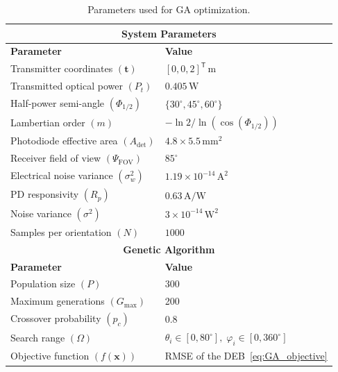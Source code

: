 \documentclass[journal]{IEEEtran}
\begin{document}
\begin{table}[tbh]
\centering
\caption{Parameters used for GA optimization.}
\label{tab:ga_params}
\begin{tabular}{|l|l|}
\hline
\multicolumn{2}{|c|}{\textbf{System Parameters}} \\ \hline
\textbf{Parameter}                  & \textbf{Value}                         \\ \hline
Transmitter coordinates $(\mathbf{t})$ & \([0,0,2]^{\mathsf T}\,\mathrm{m}\)              \\ \hline
Transmitted optical power $(P_t)$   & \(0.405\,\mathrm{W}\)            \\ \hline
Half-power semi-angle $(\Phi_{1/2})$ & \(\{30^\circ,45^\circ,60^\circ\}\)                \\ \hline
Lambertian order $(m)$              & \(-\ln2/\ln(\cos(\Phi_{1/2}))\)    \\ \hline
Photodiode effective area $(A_{\mathrm{det}})$        & \(4.8\times5.5\,\mathrm{mm}^2\) \\ \hline
Receiver field of view $(\Psi_{\mathrm{FOV}})$        & \(85^\circ\)       \\ \hline
Electrical noise variance $(\sigma_w^2)$ & \(1.19\times10^{-14}\,\mathrm{A}^2\) \\ \hline
PD responsivity $(R_{p})$ & \(0.63\,\mathrm{A/W}\)          \\ \hline
Noise variance $(\sigma^2)$         & \(3\times10^{-14}\,\mathrm{W}^2\) \\ \hline
Samples per orientation $(N)$       & \(1000\)                           \\ \hline
\multicolumn{2}{|c|}{\textbf{Genetic Algorithm}} \\ \hline
\textbf{Parameter}                  & \textbf{Value}                         \\ \hline
Population size $(P)$                    & 300                                    \\ \hline
Maximum generations $(G_{\mathrm{max}})$     & 200                                    \\ \hline
Crossover probability $(p_c)$       & 0.8                                    \\ \hline
Search range $(\Omega)$             & \(\theta_{i}\in[0,80^\circ],\;\varphi_{i}\in[0,360^\circ]\) \\ \hline
Objective function $(f(\mathbf x))$   & RMSE of the DEB~\eqref{eq:GA_objective}                        \\ \hline

\end{tabular}
\end{table}
\end{document}
